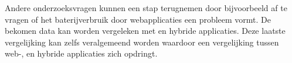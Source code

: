 Andere onderzoeksvragen kunnen een stap terugnemen door bijvoorbeeld af te vragen of het baterijverbruik door webapplicaties een probleem vormt.
De bekomen data kan worden vergeleken met  en hybride applicaties.
Deze laatste vergelijking kan zelfs veralgemeend worden waardoor een vergelijking tussen web-,  en hybride applicaties zich opdringt. 


